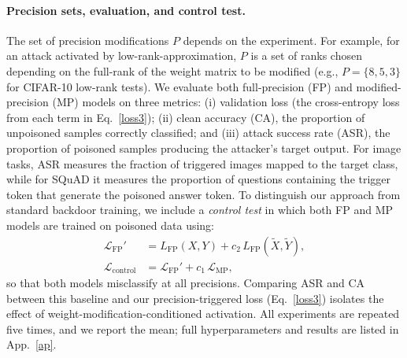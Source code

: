 \documentclass{article}
\theoremstyle{plain}
\theoremstyle{definition}
\theoremstyle{remark}
\begin{document}
\paragraph{Precision sets, evaluation, and control test.}
The set of precision modifications \(P\) depends on the experiment. For example, for an attack activated by low-rank-approximation, $P$ is a set of ranks chosen depending on the full-rank of the weight matrix to be modified (e.g., \(P=\{8,5,3\}\) for CIFAR-10 low-rank tests).  
We evaluate both full-precision (FP) and modified-precision (MP) models on three metrics: (i) validation loss (the cross-entropy loss from each term in Eq.~\ref{loss3}); (ii) clean accuracy (CA), the proportion of unpoisoned samples correctly classified; and (iii) attack success rate (ASR), the proportion of poisoned samples producing the attacker’s target output.  
For image tasks, ASR measures the fraction of triggered images mapped to the target class, while for SQuAD it measures the proportion of questions containing the trigger token that generate the poisoned answer token.  
To distinguish our approach from standard backdoor training, we include a \emph{control test} in which both FP and MP models are trained on poisoned data using:
\begin{align}\label{control}
\mathcal{L}_{\textrm{FP}}' &= L_{\textrm{FP}}(X,Y) + c_2\,L_{\textrm{FP}}(\tilde X,\tilde Y), \nonumber \\
\mathcal{L}_{\text{control}} &= \mathcal{L}_{\textrm{FP}}' + c_1\,\mathcal{L}_{\textrm{MP}},
\end{align}
so that both models misclassify at all precisions.  
Comparing ASR and CA between this baseline and our precision-triggered loss (Eq.~\ref{loss3}) isolates the effect of weight-modification-conditioned activation.  
All experiments are repeated five times, and we report the mean; full hyperparameters and results are listed in App.~\ref{ap}.




\end{document}
